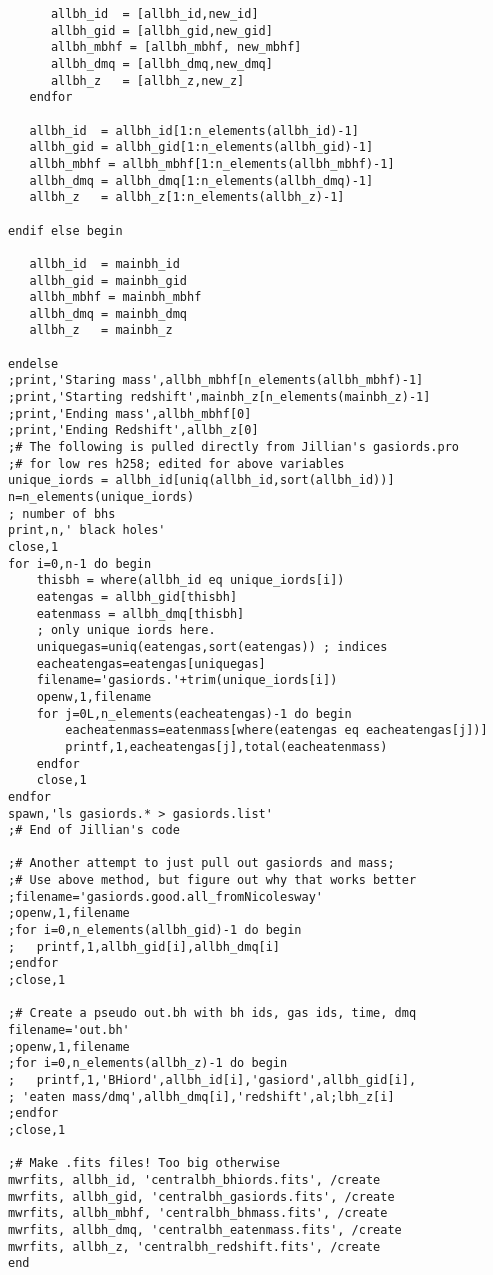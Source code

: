 \documentclass[12pt,headA,chapB]{fiskthesis}
\begin{document}
\begin{verbatim}
      allbh_id  = [allbh_id,new_id]
      allbh_gid = [allbh_gid,new_gid]
      allbh_mbhf = [allbh_mbhf, new_mbhf]
      allbh_dmq = [allbh_dmq,new_dmq]
      allbh_z   = [allbh_z,new_z]
   endfor

   allbh_id  = allbh_id[1:n_elements(allbh_id)-1]
   allbh_gid = allbh_gid[1:n_elements(allbh_gid)-1]
   allbh_mbhf = allbh_mbhf[1:n_elements(allbh_mbhf)-1]
   allbh_dmq = allbh_dmq[1:n_elements(allbh_dmq)-1]
   allbh_z   = allbh_z[1:n_elements(allbh_z)-1]

endif else begin
   
   allbh_id  = mainbh_id
   allbh_gid = mainbh_gid
   allbh_mbhf = mainbh_mbhf
   allbh_dmq = mainbh_dmq
   allbh_z   = mainbh_z

endelse
;print,'Staring mass',allbh_mbhf[n_elements(allbh_mbhf)-1]
;print,'Starting redshift',mainbh_z[n_elements(mainbh_z)-1]
;print,'Ending mass',allbh_mbhf[0]
;print,'Ending Redshift',allbh_z[0]
;# The following is pulled directly from Jillian's gasiords.pro
;# for low res h258; edited for above variables 
unique_iords = allbh_id[uniq(allbh_id,sort(allbh_id))]
n=n_elements(unique_iords)
; number of bhs
print,n,' black holes'
close,1
for i=0,n-1 do begin
    thisbh = where(allbh_id eq unique_iords[i])
    eatengas = allbh_gid[thisbh]
    eatenmass = allbh_dmq[thisbh]
    ; only unique iords here.
    uniquegas=uniq(eatengas,sort(eatengas)) ; indices
    eacheatengas=eatengas[uniquegas]
    filename='gasiords.'+trim(unique_iords[i])
    openw,1,filename
    for j=0L,n_elements(eacheatengas)-1 do begin
        eacheatenmass=eatenmass[where(eatengas eq eacheatengas[j])]
        printf,1,eacheatengas[j],total(eacheatenmass)
    endfor
    close,1
endfor
spawn,'ls gasiords.* > gasiords.list'
;# End of Jillian's code

;# Another attempt to just pull out gasiords and mass;
;# Use above method, but figure out why that works better
;filename='gasiords.good.all_fromNicolesway'
;openw,1,filename
;for i=0,n_elements(allbh_gid)-1 do begin
;   printf,1,allbh_gid[i],allbh_dmq[i]
;endfor
;close,1

;# Create a pseudo out.bh with bh ids, gas ids, time, dmq
filename='out.bh'
;openw,1,filename
;for i=0,n_elements(allbh_z)-1 do begin
;   printf,1,'BHiord',allbh_id[i],'gasiord',allbh_gid[i],
; 'eaten mass/dmq',allbh_dmq[i],'redshift',al;lbh_z[i]
;endfor
;close,1

;# Make .fits files! Too big otherwise
mwrfits, allbh_id, 'centralbh_bhiords.fits', /create
mwrfits, allbh_gid, 'centralbh_gasiords.fits', /create
mwrfits, allbh_mbhf, 'centralbh_bhmass.fits', /create
mwrfits, allbh_dmq, 'centralbh_eatenmass.fits', /create
mwrfits, allbh_z, 'centralbh_redshift.fits', /create
end
\end{verbatim}
\end{document}
